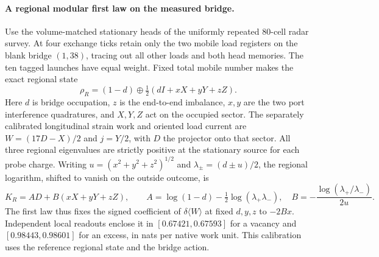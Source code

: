 \paragraph{A regional modular first law on the measured bridge.}
Use the volume-matched stationary heads of the uniformly repeated
80-cell radar survey. At four exchange ticks retain only the two mobile
load registers on the blank bridge $(1,38)$, tracing out all other loads
and both head memories. The ten tagged launches have equal weight.
Fixed total mobile number makes the exact regional state
\[
 \rho_R=(1-d)\oplus\tfrac12(dI+xX+yY+zZ).
\]
Here $d$ is bridge occupation, $z$ is the end-to-end imbalance,
$x,y$ are the two port interference quadratures, and $X,Y,Z$ act on
the occupied sector. The separately calibrated longitudinal strain
work and oriented load current are $W=(17D-X)/2$ and $j=Y/2$, with
$D$ the projector onto that sector. All three regional eigenvalues
are strictly positive at the stationary source for each probe charge.
Writing $u=(x^2+y^2+z^2)^{1/2}$ and $\lambda_\pm=(d\pm u)/2$, the
regional logarithm, shifted to vanish on the outside outcome, is
\[
 K_R=A D+B(xX+yY+zZ),\qquad
 A=\log(1-d)-\tfrac12\log(\lambda_+\lambda_-),\quad
 B=-\frac{\log(\lambda_+/\lambda_-)}{2u}.
\]
The first law thus fixes the signed coefficient of $\delta\langle W\rangle$
at fixed $d,y,z$ to $-2Bx$. Independent local readouts enclose it in
$[0.67421,0.67593]$ for a vacancy and $[0.98443,0.98601]$ for an
excess, in nats per native work unit. This calibration uses the
reference regional state and the bridge action.

